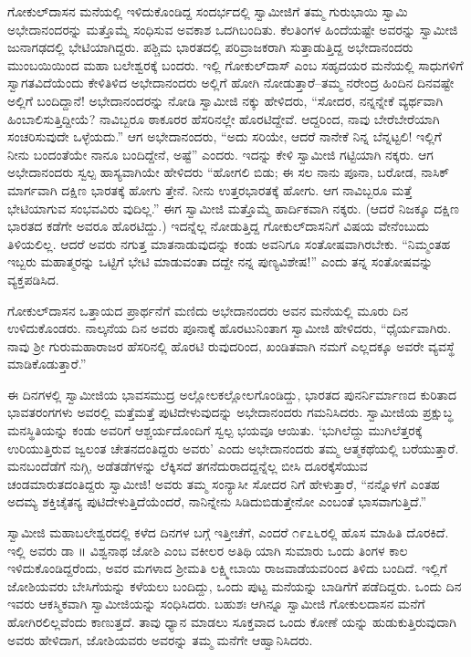 ಗೋಕುಲ್​ದಾಸನ ಮನೆಯಲ್ಲಿ ಇಳಿದುಕೊಂಡಿದ್ದ ಸಂದರ್ಭದಲ್ಲಿ ಸ್ವಾಮೀಜಿಗೆ ತಮ್ಮ ಗುರುಭಾಯಿ ಸ್ವಾಮಿ ಅಭೇದಾನಂದರನ್ನು ಮತ್ತೊಮ್ಮೆ ಸಂಧಿಸುವ ಅವಕಾಶ ಒದಗಿಬಂದಿತು. ಕೆಲತಿಂಗಳ ಹಿಂದೆಯಷ್ಟೇ ಅವರನ್ನು ಸ್ವಾಮೀಜಿ ಜುನಾಗಢದಲ್ಲಿ ಭೇಟಿಯಾಗಿದ್ದರು. ಪಶ್ಚಿಮ ಭಾರತದಲ್ಲಿ ಪರಿವ್ರಾಜಕರಾಗಿ ಸುತ್ತಾಡುತ್ತಿದ್ದ ಅಭೇದಾನಂದರು ಮುಂಬಯಿಯಿಂದ ಮಹಾ ಬಲೇಶ್ವರಕ್ಕೆ ಬಂದರು. ಇಲ್ಲಿ ಗೋಕುಲ್​ದಾಸ್ ಎಂಬ ಸಹೃದಯರ ಮನೆಯಲ್ಲಿ ಸಾಧುಗಳಿಗೆ ಸ್ವಾಗತವಿದೆಯೆಂದು ಕೇಳಿತಿಳಿದ ಅಭೇದಾನಂದರು ಅಲ್ಲಿಗೆ ಹೋಗಿ ನೋಡುತ್ತಾರೆ–ತಮ್ಮ ನರೇಂದ್ರ ಹಿಂದಿನ ದಿನವಷ್ಟೇ ಅಲ್ಲಿಗೆ ಬಂದಿದ್ದಾನೆ! ಅಭೇದಾನಂದರನ್ನು ನೋಡಿ ಸ್ವಾಮೀಜಿ ನಕ್ಕು ಹೇಳಿದರು, “ಸೋದರ, ನನ್ನನ್ನೇಕೆ ವ್ಯರ್ಥವಾಗಿ ಹಿಂಬಾಲಿಸುತ್ತಿದ್ದೀಯೆ? ನಾವಿಬ್ಬರೂ ಠಾಕೂರರ ಹೆಸರಿನಲ್ಲೇ ಹೊರಟಿದ್ದೇವೆ. ಆದ್ದರಿಂದ, ನಾವು ಬೇರೆಬೇರೆಯಾಗಿ ಸಂಚರಿಸುವುದೇ ಒಳ್ಳೆಯದು.” ಆಗ ಅಭೇದಾನಂದರು, “ಅದು ಸರಿಯೇ, ಆದರೆ ನಾನೇಕೆ ನಿನ್ನ ಬೆನ್ನಟ್ಟಲಿ! ಇಲ್ಲಿಗೆ ನೀನು ಬಂದಂತೆಯೇ ನಾನೂ ಬಂದಿದ್ದೇನೆ, ಅಷ್ಟೆ” ಎಂದರು. ಇದನ್ನು ಕೇಳಿ ಸ್ವಾಮೀಜಿ ಗಟ್ಟಿಯಾಗಿ ನಕ್ಕರು. ಆಗ ಅಭೇದಾನಂದರು ಸ್ವಲ್ಪ ಹಾಸ್ಯವಾಗಿಯೇ ಹೇಳಿದರು “ಹೋಗಲಿ ಬಿಡು; ಈ ಸಲ ನಾನು ಪೂನಾ, ಬರೋಡ, ನಾಸಿಕ್ ಮಾರ್ಗವಾಗಿ ದಕ್ಷಿಣ ಭಾರತಕ್ಕೆ ಹೋಗು ತ್ತೇನೆ. ನೀನು ಉತ್ತರಭಾರತಕ್ಕೆ ಹೋಗು. ಆಗ ನಾವಿಬ್ಬರೂ ಮತ್ತೆ ಭೇಟಿಯಾಗುವ ಸಂಭವವಿರು ವುದಿಲ್ಲ.” ಈಗ ಸ್ವಾಮೀಜಿ ಮತ್ತೊಮ್ಮೆ ಹಾರ್ದಿಕವಾಗಿ ನಕ್ಕರು. (ಆದರೆ ನಿಜಕ್ಕೂ ದಕ್ಷಿಣ ಭಾರತದ ಕಡೆಗೇ ಅವರೂ ಹೊರಟಿದ್ದು.) ಇದನ್ನೆಲ್ಲ ನೋಡುತ್ತಿದ್ದ ಗೋಕುಲ್​ದಾಸನಿಗೆ ವಿಷಯ ವೇನೆಂಬುದು ತಿಳಿಯಲಿಲ್ಲ. ಆದರೆ ಅವರು ನಗುತ್ತ ಮಾತನಾಡುವುದನ್ನು ಕಂಡು ಅವನಿಗೂ ಸಂತೋಷವಾಗಿರಬೇಕು. “ನಿಮ್ಮಂತಹ ಇಬ್ಬರು ಮಹಾತ್ಮರನ್ನು ಒಟ್ಟಿಗೆ ಭೇಟಿ ಮಾಡುವಂತಾ ದದ್ದೇ ನನ್ನ ಪುಣ್ಯವಿಶೇಷ!” ಎಂದು ತನ್ನ ಸಂತೋಷವನ್ನು ವ್ಯಕ್ತಪಡಿಸಿದ.

ಗೋಕುಲ್​ದಾಸನ ಒತ್ತಾಯದ ಪ್ರಾರ್ಥನೆಗೆ ಮಣಿದು ಅಭೇದಾನಂದರು ಅವನ ಮನೆಯಲ್ಲಿ ಮೂರು ದಿನ ಉಳಿದುಕೊಂಡರು. ನಾಲ್ಕನೆಯ ದಿನ ಅವರು ಪೂನಾಕ್ಕೆ ಹೊರಟುನಿಂತಾಗ ಸ್ವಾಮೀಜಿ ಹೇಳಿದರು, “ಧೈರ್ಯವಾಗಿರು. ನಾವು ಶ್ರೀ ಗುರುಮಹಾರಾಜರ ಹೆಸರಿನಲ್ಲಿ ಹೊರಟಿ ರುವುದರಿಂದ, ಖಂಡಿತವಾಗಿ ನಮಗೆ ಎಲ್ಲದಕ್ಕೂ ಅವರೇ ವ್ಯವಸ್ಥೆ ಮಾಡಿಕೊಡುತ್ತಾರೆ.”

ಈ ದಿನಗಳಲ್ಲಿ ಸ್ವಾಮೀಜಿಯ ಭಾವಸಮುದ್ರ ಅಲ್ಲೋಲಕಲ್ಲೋಲಗೊಂಡಿದ್ದು, ಭಾರತದ ಪುನರ್ನಿರ್ಮಾಣದ ಕುರಿತಾದ ಭಾವತರಂಗಗಳು ಅವರಲ್ಲಿ ಮತ್ತೆಮತ್ತೆ ಪುಟಿದೇಳುವುದನ್ನು ಅಭೇದಾನಂದರು ಗಮನಿಸಿದರು. ಸ್ವಾಮೀಜಿಯ ಪ್ರಕ್ಷುಬ್ಧ ಮನಸ್ಥಿತಿಯನ್ನು ಕಂಡು ಅವರಿಗೆ ಆಶ್ಚರ್ಯದೊಂದಿಗೆ ಸ್ವಲ್ಪ ಭಯವೂ ಆಯಿತು. ‘ಭುಗಿಲೆದ್ದು ಮುಗಿಲೆತ್ತರಕ್ಕೆ ಉರಿಯುತ್ತಿರುವ ಜ್ವಲಂತ ಚೇತನದಂತಿದ್ದರು ಅವರು’ ಎಂದು ಅಭೇದಾನಂದರು ತಮ್ಮ ಆತ್ಮಕಥೆಯಲ್ಲಿ ಬರೆಯುತ್ತಾರೆ. ಮನಬಂದೆಡೆಗೆ ನುಗ್ಗಿ, ಅಡೆತಡೆಗಳನ್ನು ಲೆಕ್ಕಿಸದೆ ತಗನೆದುರಾದದ್ದನ್ನೆಲ್ಲ ಬೀಸಿ ದೂರಕ್ಕೆಸೆಯುವ ಚಂಡಮಾರುತದಂತಿದ್ದರು ಸ್ವಾಮೀಜಿ! ಅವರು ತಮ್ಮ ಸಂನ್ಯಾಸೀ ಸೋದರ ನಿಗೆ ಹೇಳುತ್ತಾರೆ, “ನನ್ನೊಳಗೆ ಎಂತಹ ಅದಮ್ಯ ಶಕ್ತಿಚೈತನ್ಯ ಪುಟಿದೇಳುತ್ತಿದೆಯೆಂದರೆ, ನಾನಿನ್ನೇನು ಸಿಡಿದುಬಿಡುತ್ತೇನೋ ಎಂಬಂತೆ ಭಾಸವಾಗುತ್ತಿದೆ.”

ಸ್ವಾಮೀಜಿ ಮಹಾಬಲೇಶ್ವರದಲ್ಲಿ ಕಳೆದ ದಿನಗಳ ಬಗ್ಗೆ ಇತ್ತೀಚೆಗೆ, ಎಂದರೆ ೧೯೭೬ರಲ್ಲಿ ಹೊಸ ಮಾಹಿತಿ ದೊರಕಿದೆ. ಇಲ್ಲಿ ಅವರು ಡಾ ॥ ವಿಶ್ವನಾಥ ಜೋಶಿ ಎಂಬ ವಕೀಲರ ಅತಿಥಿ ಯಾಗಿ ಸುಮಾರು ಒಂದು ತಿಂಗಳ ಕಾಲ ಇಳಿದುಕೊಂಡಿದ್ದರೆಂದು, ಅವರ ಮಗಳಾದ ಶ್ರೀಮತಿ ಲಕ್ಷ್ಮೀಬಾಯಿ ರಾಜವಾಡೆಯವರಿಂದ ತಿಳಿದು ಬಂದಿದೆ. ಇಲ್ಲಿಗೆ ಜೋಶಿಯವರು ಬೇಸಿಗೆಯನ್ನು ಕಳೆಯಲು ಬಂದಿದ್ದು, ಒಂದು ಪುಟ್ಟ ಮನೆಯನ್ನು ಬಾಡಿಗೆಗೆ ಪಡೆದಿದ್ದರು. ಒಂದು ದಿನ ಇವರು ಆಕಸ್ಮಿಕವಾಗಿ ಸ್ವಾಮೀಜಿಯನ್ನು ಸಂಧಿಸಿದರು. ಬಹುಶಃ ಆಗಿನ್ನೂ ಸ್ವಾಮೀಜಿ ಗೋಕುಲದಾಸನ ಮನೆಗೆ ಹೋಗಿರಲಿಲ್ಲವೆಂದು ಕಾಣುತ್ತದೆ. ತಾವು ಧ್ಯಾನ ಮಾಡಲು ಸೂಕ್ತವಾದ ಒಂದು ಕೋಣೆ ಯನ್ನು ಹುಡುಕುತ್ತಿರುವುದಾಗಿ ಅವರು ಹೇಳಿದಾಗ, ಜೋಶಿಯವರು ಅವರನ್ನು ತಮ್ಮ ಮನೆಗೇ ಆಹ್ವಾನಿಸಿದರು.


